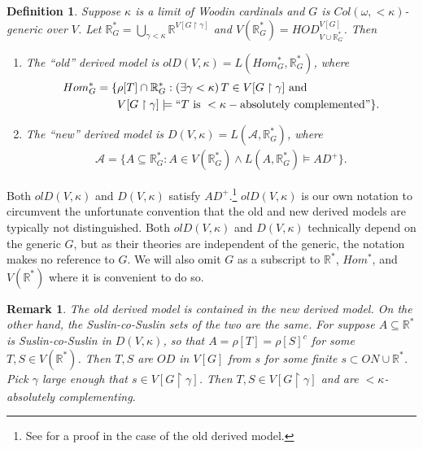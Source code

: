 \documentclass[12pt]{article}
\newtheorem{definition}[theorem]{Definition}
\newtheorem{remark}[theorem]{Remark}
\newcommand\R{\mathbb{R}}
\begin{document}
\begin{definition}
    Suppose $\kappa$ is a limit of Woodin cardinals and $G$ is $Col(\omega,<\kappa)$-generic over $V$. Let $\R^*_G = \bigcup_{\gamma < \kappa} \R^{V[G\upharpoonright\gamma]}$ and $V(\R^*_G) = HOD^{V[G]}_{V\cup \R^*_G}$. Then
    \begin{enumerate}
        \item The ``old'' derived model is $olD(V,\kappa) = L(Hom^*_G,\R^*_G)$, where 
        \begin{align*}
            Hom^*_G = \{ & \rho[T] \cap \R^*_G : (\exists \gamma < \kappa) \, T\in V[G\upharpoonright\gamma] \text{ and } \\
            & V[G\upharpoonright\gamma] \models ``T \text{ is } <\kappa-\text{absolutely complemented''}\}.
        \end{align*}
        
        \item The ``new'' derived model is $D(V,\kappa) = L(\mathcal{A},\R^*_G)$, where 
        \begin{align*}
            \mathcal{A} = \{A\subseteq \R^*_G: A\in V(\R^*_G) \wedge L(A,\R^*_G) \models AD^+\}.
        \end{align*}
        
        
        
    \end{enumerate}
\end{definition}

Both $olD(V,\kappa)$ and $D(V,\kappa)$ satisfy $AD^+$.\footnote{See \cite{dmt} for a proof in the case of the old derived model.} $olD(V,\kappa)$ is our own notation to circumvent the unfortunate convention that the old and new derived models are typically not distinguished. Both $olD(V,\kappa)$ and $D(V,\kappa)$ technically depend on the generic $G$, but as their theories are independent of the generic, the notation makes no reference to $G$. We will also omit $G$ as a subscript to $\R^*$, $Hom^*$, and $V(\R^*)$ where it is convenient to do so.

\begin{remark}
\label{same suslin-co-suslin sets}
    The old derived model is contained in the new derived model. On the other hand, the Suslin-co-Suslin sets of the two are the same. For suppose $A\subseteq\R^*$ is Suslin-co-Suslin in $D(V,\kappa)$, so that $A = \rho[T] = \rho[S]^c$ for some $T,S\in V(\R^*)$. Then $T,S$ are $OD$ in $V[G]$ from $s$ for some finite $s\subset ON \cup \R^*$. Pick $\gamma$ large enough that $s\in V[G\upharpoonright\gamma]$. Then $T,S\in V[G\upharpoonright\gamma]$ and are $<\kappa$-absolutely complementing.
\end{remark}
\end{document}
